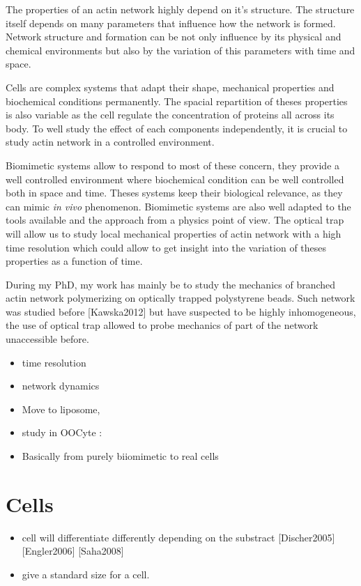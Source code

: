\documentclass[A4paperpaper,11pt,english]{sphinxmanual}
\begin{document}
The properties of an actin network highly depend on it's structure. The
structure itself depends on many parameters that influence how the network is
formed. Network structure and formation can be not only influence by its
physical and chemical environments but also by the variation of this
parameters with time and space.

Cells are complex systems that adapt their shape, mechanical properties and
biochemical conditions permanently. The spacial repartition of theses
properties is also variable as the cell regulate the concentration of proteins
all across its body. To well study the effect of each components independently,
it is crucial to study actin network in a controlled environment.

Biomimetic systems allow to respond to most of these concern, they provide a
well controlled environment where biochemical condition can be well controlled
both in space and time. Theses systems keep their biological relevance, as they
can mimic \emph{in vivo} phenomenon. Biomimetic systems are also well adapted to the
tools available and the approach from a physics point of view. The optical trap
will allow us to study local mechanical properties of actin  network  with a
high time resolution which could allow to get insight into the variation of
theses properties as a function of time.

During my PhD, my work has mainly be to study the mechanics of branched actin
network polymerizing on optically trapped polystyrene beads. Such network was
studied before {[}Kawska2012{]}  but have suspected to be highly inhomogeneous,
the use of optical trap allowed to probe mechanics of part of the network
unaccessible before.
\begin{itemize}
\item {} 
time resolution

\item {} 
network dynamics

\item {} 
Move to liposome,

\item {} 
study in OOCyte :

\item {} 
Basically from purely biiomimetic to real cells

\end{itemize}


\section{Cells}
\label{parts/part1:cells}\begin{itemize}
\item {} 
cell will differentiate differently depending on the substract  {[}Discher2005{]} {[}Engler2006{]} {[}Saha2008{]}

\item {} 
give a standard size for a cell.

\end{itemize}
\end{document}
